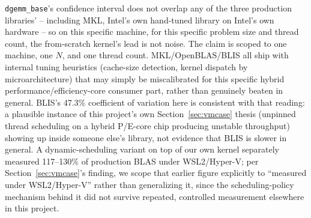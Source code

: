 \documentclass[acmsmall]{acmart}
\begin{document}
\texttt{dgemm\_base}'s confidence interval does not overlap any of the
three production libraries' -- including MKL, Intel's own hand-tuned
library on Intel's own hardware -- so on this specific machine, for this
specific problem size and thread count, the from-scratch kernel's lead
is not noise. The claim is scoped to one machine, one $N$, and one
thread count. MKL/OpenBLAS/BLIS all ship with internal
tuning heuristics (cache-size detection, kernel dispatch by
microarchitecture) that may simply be miscalibrated for this specific
hybrid performance/efficiency-core consumer part, rather than genuinely
beaten in general. BLIS's 47.3\% coefficient of
variation here is consistent with that reading: a plausible instance of
this project's own Section~\ref{sec:vmcase} thesis (unpinned thread
scheduling on a hybrid P/E-core chip producing unstable throughput)
showing up inside someone else's library, not evidence that BLIS is
slower in general. A dynamic-scheduling variant on top of our own
kernel separately measured 117--130\% of production BLAS under
WSL2/Hyper-V; per Section~\ref{sec:vmcase}'s finding, we scope that
earlier figure explicitly to ``measured under WSL2/Hyper-V'' rather than
generalizing it, since the scheduling-policy mechanism behind it did not
survive repeated, controlled measurement elsewhere in this project.
\end{document}
